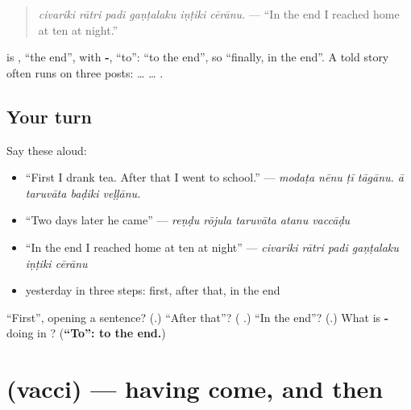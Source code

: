 \begin{quote}
\emph{civariki rātri padi gaṇṭalaku iṇṭiki cērānu.} — \textquotedblleft{}In the end I reached home at ten at night.\textquotedblright{}
\end{quote}

\textbf{} is \textbf{}, \textquotedblleft{}the end\textquotedblright{}, with \textbf{-}, \textquotedblleft{}to\textquotedblright{}: \textquotedblleft{}to the end\textquotedblright{}, so \textquotedblleft{}finally, in the end\textquotedblright{}. A told story often runs on three posts: \textbf{} … \textbf{ } … \textbf{}.

\subsection*{Your turn}
Say these aloud:

\begin{itemize}
\raggedright
  \item \textquotedblleft{}First I drank tea. After that I went to school.\textquotedblright{} — \emph{modaṭa nēnu ṭī tāgānu. ā taruvāta baḍiki veḷḷānu.}
  \item \textquotedblleft{}Two days later he came\textquotedblright{} — \emph{reṇḍu rōjula taruvāta atanu vaccāḍu}
  \item \textquotedblleft{}In the end I reached home at ten at night\textquotedblright{} — \emph{civariki rātri padi gaṇṭalaku iṇṭiki cērānu}
  \item yesterday in three steps: first, after that, in the end
\end{itemize}

\begin{tcolorbox}[breakable,colback=teal!4,colframe=teal!35!black,title={Before you move on}]
\textquotedblleft{}First\textquotedblright{}, opening a sentence? (\textbf{}.) \textquotedblleft{}After that\textquotedblright{}? (\textbf{ }.) \textquotedblleft{}In the end\textquotedblright{}? (\textbf{}.) What is \textbf{-} doing in \textbf{}? (\textbf{\textquotedblleft{}To\textquotedblright{}: to the end.})
\end{tcolorbox}
\section[\texorpdfstring{\te{వచ్చి} (vacci)}{వచ్చి (vacci)}]{ (vacci) — having come, and then}

